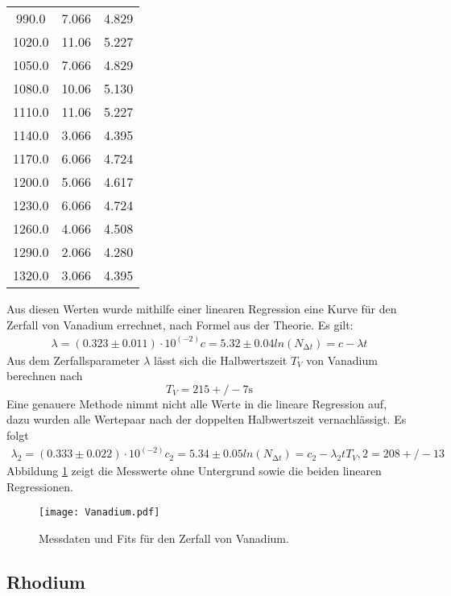 \begin{table}
\begin{tabular}{S S S}
  990.0   & 7.066  & 4.829  \\
  1020.0  & 11.06  & 5.227  \\
  1050.0  & 7.066  & 4.829  \\
  1080.0  & 10.06  & 5.130  \\
  1110.0  & 11.06  & 5.227  \\
  1140.0  & 3.066  & 4.395  \\
  1170.0  & 6.066  & 4.724  \\
  1200.0  & 5.066  & 4.617  \\
  1230.0  & 6.066  & 4.724  \\
  1260.0  & 4.066  & 4.508  \\
  1290.0  & 2.066  & 4.280  \\
  1320.0  & 3.066  & 4.395  
  \bottomrule
 \end{tabular}
\end{table}

\noindent Aus diesen Werten wurde mithilfe einer linearen Regression
eine Kurve für den Zerfall von Vanadium errechnet, nach Formel %
aus der Theorie. Es gilt:
\begin{align}
    \lambda = (0.323 \pm 0.011) \cdot 10^(-2)
    c = 5.32 \pm 0.04
    ln(N_{\increment t}) = c - \lambda t 
\end{align}
Aus dem Zerfallsparameter $\lambda$ lässt sich die Halbwertszeit $T_V$ von
Vanadium berechnen nach %
\begin{equation}
    T_V = 215+/-7 \si{\s}
\end{equation}
Eine genauere Methode nimmt nicht alle Werte in die lineare Regression auf,
dazu wurden alle Wertepaar nach der doppelten Halbwertszeit vernachlässigt.
Es folgt
\begin{align}
    \lambda_2 = (0.333 \pm 0.022) \cdot 10^(-2)
    c_2 = 5.34 \pm 0.05
    ln(N_{\increment t}) = c_2 - \lambda_2 t 
    T_V,2 = 208+/-13
\end{align}
Abbildung \ref{fig:vankurve}
zeigt die Messwerte ohne Untergrund sowie die beiden linearen Regressionen.

\begin{figure}
 \centering
 \texttt{[image: Vanadium.pdf]}
 \caption{Messdaten und Fits für den Zerfall von Vanadium.}
 \label{fig:vankurve}
\end{figure}

\subsection{Rhodium}
